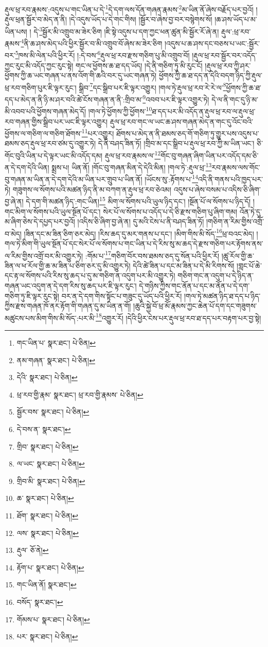 རྡུལ་ཕྲ་རབ་རྣམས་:འདུས་པ་གང་ཡིན་པ་དེ་\footnote{གང་ཡིན་པ་  སྣར་ཐང་།  པེ་ཅིན། }དེ་དག་ལས་དོན་གཞན་རྣམས་\footnote{ནམ་གཞན་  སྣར་ཐང་།  པེ་ཅིན། }མ་ཡིན་ནོ་ཞེས་བརྗོད་པར་བྱའོ། །རྡུལ་ཕྲན་སྦྱོར་བ་མེད་ན་ནི། །དེ་འདུས་ཡོད་པ་དེ་གང་གིས། །སྦྱོར་བ་ཞེས་བྱ་བར་བསྙེགས་སོ། །ཆ་ཤས་ཡོད་པ་མ་ཡིན་པས། །
དེ་\footnote{དེའི་  སྣར་ཐང་།  པེ་ཅིན། }སྦྱོར་མི་འགྲུབ་མ་ཟེར་ཅིག །ཇི་སྟེ་འདུས་པ་དག་ཀྱང་ཕན་ཚུན་མི་སྦྱོར་རོ་ཞེ་ན། རྡུལ་:ཕྲ་རབ་རྣམས་\footnote{ཕྲ་རབ་གྱི་རྣམ་  སྣར་ཐང་། ཕྲ་རབ་གྱི་རྣམས་  པེ་ཅིན། }ནི་ཆ་ཤས་མེད་པའི་ཕྱིར་སྦྱོར་བ་མི་འགྲུབ་བོ་ཞེས་མ་ཟེར་ཅིག །འདུས་པ་ཆ་ཤས་དང་བཅས་པ་ཡང་:སྦྱོར་བར་\footnote{སྦྱོར་བས་  སྣར་ཐང་།  པེ་ཅིན། }ཁས་མི་ལེན་པའི་ཕྱིར་རོ། །:དེ་བས་\footnote{དེ་བས་ན་  སྣར་ཐང་། }རྡུལ་ཕྲ་རབ་རྫས་གཅིག་པུ་མི་འགྲུབ་བོ། །རྡུལ་ཕྲ་རབ་སྦྱོར་བར་འདོད་ཀྱང་རུང་མི་འདོད་ཀྱང་རུང་སྟེ། གང་ལ་ཕྱོགས་ཆ་ཐ་དད་ཡོད། །དེ་ནི་གཅིག་ཏུ་མི་རུང་ངོ། །རྡུལ་ཕྲ་རབ་ཀྱི་ཤར་ཕྱོགས་ཀྱི་ཆ་ཡང་གཞན་པ་ནས་འོག་གི་ཆའི་བར་དུ་ཡང་གཞན་ཏེ། ཕྱོགས་ཀྱི་ཆ་ཐ་དད་ན་དེའི་བདག་ཉིད་ཀྱི་རྡུལ་ཕྲ་རབ་གཅིག་པུར་ཇི་ལྟར་རུང་། སྒྲིབ་\footnote{གྲིབ་  སྣར་ཐང་།  པེ་ཅིན། }དང་སྒྲིབ་པར་ཇི་ལྟར་འགྱུར། །གལ་ཏེ་རྡུལ་ཕྲ་རབ་རེ་རེ་ལ་\footnote{ལ་ཡང་  སྣར་ཐང་།  པེ་ཅིན། }ཕྱོགས་ཀྱི་ཆ་ཐ་དད་པ་མེད་ན་ནི་ཉི་མ་ཤར་བའི་ཚེ་ངོས་གཞན་ན་ནི་:གྲིབ་མ་\footnote{གྲིབ་མི་  སྣར་ཐང་།  པེ་ཅིན། }འབབ་པར་ཇི་ལྟར་འགྱུར་ཏེ། དེ་ལ་ནི་གང་དུ་ཉི་མ་མི་འབབ་པའི་ཕྱོགས་གཞན་མེད་དོ། །གལ་ཏེ་ཕྱོགས་ཀྱི་ཕྱོགས་\footnote{ཆ་  སྣར་ཐང་།  པེ་ཅིན། }ཐ་དད་པར་མི་འདོད་ན་རྡུལ་ཕྲ་རབ་ལ་རྡུལ་ཕྲ་རབ་གཞན་གྱིས་སྒྲིབ་པར་ཡང་ཇི་ལྟར་འགྱུར། རྡུལ་ཕྲ་རབ་གང་ལ་ཡང་ཆ་ཤས་གཞན་མེད་ན་གང་དུ་འོང་བའི་ཕྱོགས་ལ་གཅིག་ལ་གཅིག་ཐོགས་\footnote{ཐོག་  སྣར་ཐང་།  པེ་ཅིན། }པར་འགྱུར། ཐོགས་པ་མེད་ན་ནི་ཐམས་ཅད་གོ་གཅིག་ཏུ་གྱུར་པས་འདུས་པ་ཐམས་ཅད་རྡུལ་ཕྲ་རབ་ཙམ་དུ་འགྱུར་ཏེ། དེ་ནི་བཤད་ཟིན་ཏོ། །གྲིབ་མ་དང་སྒྲིབ་པ་རྡུལ་ཕྲ་རབ་ཀྱི་མ་ཡིན་ཡང་། ཅི་གོང་བུའི་ཡིན་པ་དེ་ལྟར་ཡང་མི་འདོད་དམ། རྡུལ་ཕྲ་རབ་རྣམས་ལ་\footnote{ལས་  སྣར་ཐང་།  པེ་ཅིན། }གོང་བུ་གཞན་ཞིག་ཡིན་པར་འདོད་དམ་ཅི་ན་དེ་དག་དེའི་ཡིན། སྨྲས་པ། ཡིན་ནོ། །གོང་བུ་གཞན་མིན་དེ་དེའི་མིན། །གལ་ཏེ་:རྡུལ་ཕྲ་\footnote{རྡུལ་  ཅོ་ནེ། }རབ་རྣམས་ལས་གོང་བུ་གཞན་མ་ཡིན་ན་དེ་དག་དེའི་མ་ཡིན་པར་གྲུབ་པ་ཡིན་ནོ། །ཡོངས་སུ་:རྟོགས་པ་\footnote{རྟོག་པ་  སྣར་ཐང་།  པེ་ཅིན། }འདི་ནི་གནས་པའི་ཁྱད་པར་ཏེ། གཟུགས་ལ་སོགས་པའི་མཚན་ཉིད་ནི་མ་བཀག་ན་རྡུལ་ཕྲ་རབ་ཅེའམ། འདུས་པ་ཞེས་བསམ་པ་འདིས་ཅི་ཞིག་བྱ་ཞེ་ན། དེ་དག་གི་མཚན་ཉིད་:གང་ཡིན།\footnote{གང་ཡིན་ནོ།  སྣར་ཐང་། } མིག་ལ་སོགས་པའི་ཡུལ་ཉིད་དང་། །སྔོན་པོ་ལ་སོགས་པ་ཉིད་དོ། །གང་མིག་ལ་སོགས་པའི་ཡུལ་སྔོན་པོ་དང་། སེར་པོ་ལ་སོགས་པ་འདོད་པ་དེ་ཅི་རྫས་གཅིག་པུ་ཞིག་གམ། འོན་ཏེ་དུ་མ་ཞིག་ཅེས་དེ་དཔྱད་པར་བྱའོ། །འདིས་ཅི་ཞིག་བྱ་ཞེ་ན། དུ་མའི་ངེས་པ་ནི་བཤད་ཟིན་ཏོ། །གཅིག་ན་རིམ་གྱིས་འགྲོ་བ་མེད། །ཟིན་དང་མ་ཟིན་ཅིག་ཅར་མེད། །རིས་ཆད་དུ་མར་གནས་པ་དང་། །མིག་གིས་མི་སོད་\footnote{བསོད་  སྣར་ཐང་། }ཕྲ་བའང་མེད། །གལ་ཏེ་མིག་གི་ཡུལ་སྔོན་པོ་དང་སེར་པོ་ལ་སོགས་པ་གང་ཡིན་པ་དེ་རིས་སུ་མ་ཆད་དེ་རྫས་གཅིག་པར་རྟོགས་ནས་ལ་རིམ་གྱིས་འགྲོ་བར་མི་འགྱུར་ཏེ། :གོམ་པ་\footnote{གོམས་པ་  སྣར་ཐང་།  པེ་ཅིན། }གཅིག་བོར་བས་ཐམས་ཅད་དུ་སོན་པའི་ཕྱིར་རོ། །ཚུ་རོལ་གྱི་ཆ་ཟིན་ལ་ཕ་རོལ་གྱི་ཆ་མ་ཟིན་པ་ཅིག་ཅར་དུ་མི་འགྱུར་ཏེ། དེའི་ཚེ་ཟིན་པ་དང་མ་ཟིན་པ་དེ་མི་རིགས་སོ། །གླང་པོ་ཆེ་དང་རྟ་ལ་སོགས་པའི་རིས་སུ་ཆད་པ་དུ་མ་གཅིག་ན་འདུག་པར་མི་འགྱུར་ཏེ། གཅིག་གང་ན་འདུག་པ་དེ་ཉིད་ན་གཞན་ཡང་འདུག་ན་དེ་དག་རིས་སུ་ཆད་པར་ཇི་ལྟར་རུང་། དེ་གཉིས་ཀྱིས་གང་ནོན་པ་དང་མ་ནོན་པ་དེ་དག་གཅིག་ཏུ་ཇི་ལྟར་རུང་སྟེ། བར་ན་དེ་དག་གིས་སྟོང་པ་གཟུང་དུ་ཡོད་པའི་ཕྱིར་རོ། །གལ་ཏེ་མཚན་ཉིད་ཐ་དད་པ་ཉིད་ཀྱིས་རྫས་གཞན་ཁོ་ནར་རྟོག་གི་གཞན་དུ་མ་ཡིན་ན་གོ། །ཆུའི་སྐྱེ་བོ་ཕྲ་མོ་རྣམས་ཀྱང་ཆེན་པོ་དག་དང་གཟུགས་མཚུངས་པས་མིག་གིས་མི་སོད་:པར་མི་\footnote{པར་  སྣར་ཐང་།  པེ་ཅིན། }འགྱུར་རོ། །དེའི་ཕྱིར་ངེས་པར་རྡུལ་ཕྲ་རབ་ཐ་དད་པར་བརྟག་པར་བྱ་སྟེ། 